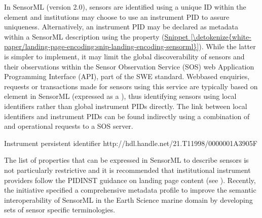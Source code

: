 \documentclass[a4paper,10pt,english]{sphinxmanual}
\begin{document}
\sphinxAtStartPar
In SensorML (version 2.0), sensors are identified using a unique ID
within the  element and institutions may choose to use
an instrument PID to assure uniqueness. Alternatively, an instrument PID
may be declared as metadata within a SensorML description using the
 property (\hyperref[\detokenize{white-paper/landing-page-encoding:snip-landing-encoding-sensorml}]{Snippet \ref{\detokenize{white-paper/landing-page-encoding:snip-landing-encoding-sensorml}}}).
While the latter is simpler to implement, it may limit the global
discoverability of sensors and their observations within the Sensor
Observation Service (SOS) web Application Programming Interface (API),
part of the SWE standard. Web\sphinxhyphen{}based enquiries, requests or
transactions made for sensors using this service are typically based
on  element in SensorML (expressed as a ),
thus identifying sensors using local identifiers rather than global
instrument PIDs directly. The link between local identifiers and
instrument PIDs can be found indirectly using a combination of
 and  operational requests to a SOS
server.
\def\sphinxLiteralBlockLabel{\label{\detokenize{white-paper/landing-page-encoding:snip-landing-encoding-sensorml}}}
\begin{sphinxVerbatim}[commandchars=\\\{\}]
     
       Instrument persistent identifier
       http://hdl.handle.net/21.T11998/0000\PYGZhy{}001A\PYGZhy{}3905\PYGZhy{}F
\end{sphinxVerbatim}

\sphinxAtStartPar
The list of properties that can be expressed in SensorML to describe
sensors is not particularly restrictive and it is recommended that
institutional instrument providers follow the PIDINST guidance on
landing page content (see {\hyperref[\detokenize{white-paper/landing-page-content:landing-page-content}]{}}).  Recently, the
 initiative specified a comprehensive metadata
profile to improve the semantic interoperability of SensorML in the
Earth Science marine domain by developing sets of sensor specific
terminologies.
\end{document}

